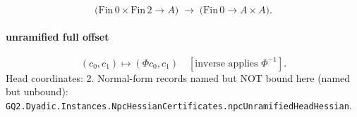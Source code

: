\[\bigl(\mathrm{Fin}\,0\times\mathrm{Fin}\,2\to A\bigr)\;\longrightarrow\;\bigl(\mathrm{Fin}\,0\to A\times A\bigr).\]
\paragraph{unramified full offset}
\[(c_0,c_1)\mapsto(\Phi c_0,c_1)\quad[\text{inverse applies }\Phi^{-1}].\]
Head coordinates: 2. Normal-form records named but NOT bound here (named but unbound): \texttt{GQ2.Dyadic.Instances.NpcHessianCertificates.npcUnramifiedHeadHessian}.
